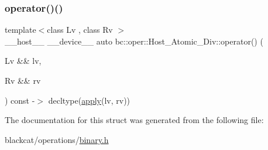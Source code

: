 \mbox{\label{structbc_1_1oper_1_1Host__Atomic__Div_a8ab2b70501a83617ef88b3ca3a4afd4c}} 
\subsubsection{\texorpdfstring{operator()()}{operator()()}}
{\footnotesize\ttfamily template$<$class Lv , class Rv $>$ \\
\+\_\+\+\_\+host\+\_\+\+\_\+ \+\_\+\+\_\+device\+\_\+\+\_\+ auto bc\+::oper\+::\+Host\+\_\+\+Atomic\+\_\+\+Div\+::operator() (\begin{DoxyParamCaption}\item[{Lv \&\&}]{lv,  }\item[{Rv \&\&}]{rv }\end{DoxyParamCaption}) const -\/$>$ decltype(\hyperlink{structbc_1_1oper_1_1Host__Atomic__Div_a5557f236a09a53011fe52e888c83d4fa}{apply}(lv, rv)) \hspace{0.3cm}{\ttfamily [inline]}}



The documentation for this struct was generated from the following file\+:\begin{DoxyCompactItemize}
\item 
blackcat/operations/\hyperlink{binary_8h}{binary.\+h}\end{DoxyCompactItemize}
